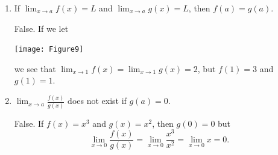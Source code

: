 \documentclass[nooutcomes]{ximera}
\begin{document}
\begin{problem}
\begin{enumerate}
			\item  If $ \lim_{x \to a} f(x) = L $ and $  \lim_{x \to a} g(x) = L $, then $f(a) = g(a)$.
			\begin{freeResponse}
			 False.  If we let 
			 
			 	\begin{image}
			       \texttt{[image: Figure9]}
			 	\end{image}
				
			 we see that $ \lim_{x \to 1} f(x) = \lim_{x \to 1} g(x) = 2$, but $f(1) = 3$ and $g(1) = 1$.
			\end{freeResponse}
			
			\item  $ \lim_{x \to a} \frac{f(x)}{g(x)} $ does not exist if $g(a) = 0$.
			\begin{freeResponse}
			False.  If $f(x) = x^3$ and $g(x) = x^2$, then $g(0) = 0$ but 
			$$ \lim_{x \to 0} \frac{f(x)}{g(x)} = \lim_{x \to 0} \frac{x^3}{x^2} = \lim_{x \to 0} x = 0.$$
			\end{freeResponse}
			
			
			
			\end{enumerate}
\end{problem}
	
\end{document}
